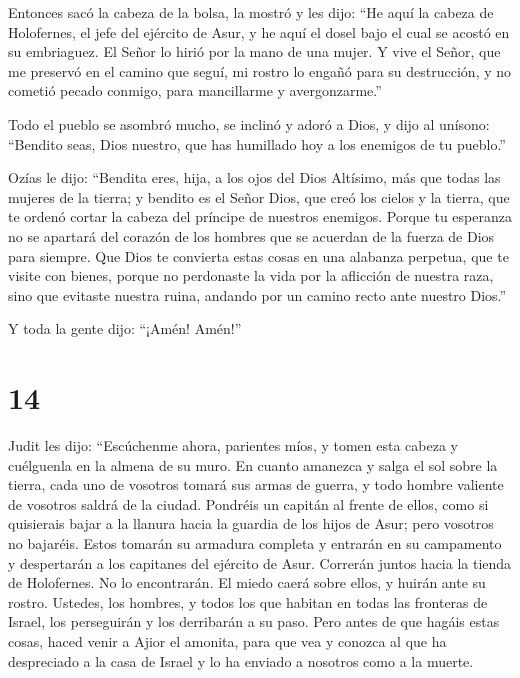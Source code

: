  Entonces sacó la cabeza de la bolsa, la mostró y les
dijo: ``He aquí la cabeza de Holofernes, el jefe del ejército de Asur, y
he aquí el dosel bajo el cual se acostó en su embriaguez. El Señor lo
hirió por la mano de una mujer.  Y vive el Señor, que me
preservó en el camino que seguí, mi rostro lo engañó para su
destrucción, y no cometió pecado conmigo, para mancillarme y
avergonzarme.''

 Todo el pueblo se asombró mucho, se inclinó y adoró a
Dios, y dijo al unísono: ``Bendito seas, Dios nuestro, que has humillado
hoy a los enemigos de tu pueblo.''

 Ozías le dijo: ``Bendita eres, hija, a los ojos del Dios
Altísimo, más que todas las mujeres de la tierra; y bendito es el Señor
Dios, que creó los cielos y la tierra, que te ordenó cortar la cabeza
del príncipe de nuestros enemigos.  Porque tu esperanza
no se apartará del corazón de los hombres que se acuerdan de la fuerza
de Dios para siempre.  Que Dios te convierta estas cosas
en una alabanza perpetua, que te visite con bienes, porque no perdonaste
la vida por la aflicción de nuestra raza, sino que evitaste nuestra
ruina, andando por un camino recto ante nuestro Dios.''

Y toda la gente dijo: ``¡Amén! Amén!''

\hypertarget{section-13}{%
\section{14}\label{section-13}}

 Judit les dijo: ``Escúchenme ahora, parientes míos, y
tomen esta cabeza y cuélguenla en la almena de su muro. 
En cuanto amanezca y salga el sol sobre la tierra, cada uno de vosotros
tomará sus armas de guerra, y todo hombre valiente de vosotros saldrá de
la ciudad. Pondréis un capitán al frente de ellos, como si quisierais
bajar a la llanura hacia la guardia de los hijos de Asur; pero vosotros
no bajaréis.  Estos tomarán su armadura completa y
entrarán en su campamento y despertarán a los capitanes del ejército de
Asur. Correrán juntos hacia la tienda de Holofernes. No lo encontrarán.
El miedo caerá sobre ellos, y huirán ante su rostro. 
Ustedes, los hombres, y todos los que habitan en todas las fronteras de
Israel, los perseguirán y los derribarán a su paso.  Pero
antes de que hagáis estas cosas, haced venir a Ajior el amonita, para
que vea y conozca al que ha despreciado a la casa de Israel y lo ha
enviado a nosotros como a la muerte.

